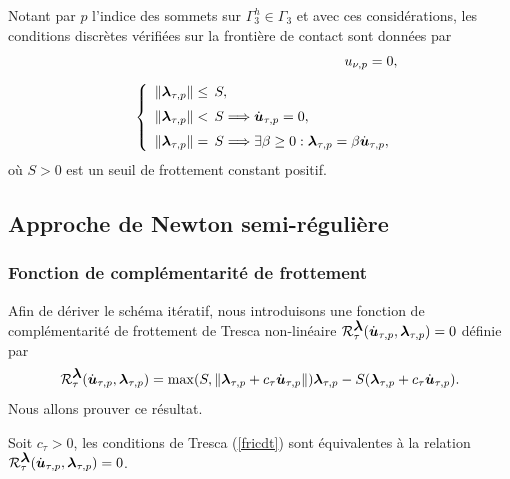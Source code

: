 Notant par $p$ l'indice des sommets sur $\Gamma_3^h\in \Gamma_3$ et avec ces considérations, les conditions discrètes vérifiées sur la frontière de contact sont données par
\begin{eqnarray}
&&\label{1nudt}u_{\nu, p}=0,\\[2mm]
&&\label{fricdt} \left\{\begin{array}{ll}
\|\mbox{\boldmath{$\lambda$}}_{\tau, p}\|\le\,S,\\[2mm]
\|\mbox{\boldmath{$\lambda$}}_{\tau, p}\|<\,S\Longrightarrow \dot{\mbox{\boldmath{$u$}}}_{\tau, p}=0,\\[2mm]
\|\mbox{\boldmath{$\lambda$}}_{\tau, p}\|=\,S\Longrightarrow \exists \beta\ge 0: \mbox{\boldmath{$\lambda$}}_{\tau, p}=\beta \dot{\mbox{\boldmath{$u$}}}_{\tau, p},
\end{array}\right.
\end{eqnarray}
où $S>0$ est un seuil de frottement constant positif.

\subsection{Approche de Newton semi-régulière}\label{Activeset_type}

\subsubsection{Fonction de complémentarité de frottement}\label{comp_cont}

Afin de dériver le schéma itératif, nous introduisons une fonction de complémentarité de frottement de Tresca non-linéaire ${\cal R}_{\tau}^{\mbox{\boldmath{$\lambda$}}}(\dot{\mbox{\boldmath{$u$}}}_{\tau, p},\mbox{\boldmath{$\lambda$}}_{\tau, p})=0$ définie par
\begin{equation}\label{ctresca}
{\cal R}_{\tau}^{\mbox{\boldmath{$\lambda$}}}(\dot{\mbox{\boldmath{$u$}}}_{\tau, p},\mbox{\boldmath{$\lambda$}}_{\tau, p})=\max ( S, \|\mbox{\boldmath{$\lambda$}}_{\tau, p}+c_\tau \dot{\mbox{\boldmath{$u$}}}_{\tau, p}\|)\mbox{\boldmath{$\lambda$}}_{\tau, p}- S (\mbox{\boldmath{$\lambda$}}_{\tau, p}+c_\tau \dot{\mbox{\boldmath{$u$}}}_{\tau, p}).
\end{equation}
Nous allons prouver ce résultat.
\begin{proposition}\label{prop1}
Soit $c_\tau>0$, les conditions de Tresca (\ref{fricdt}) sont équivalentes à la relation ${\cal R}_{\tau}^{\mbox{\boldmath{$\lambda$}}}(\dot{\mbox{\boldmath{$u$}}}_{\tau, p},\mbox{\boldmath{$\lambda$}}_{\tau, p})=0$.
\end{proposition}

